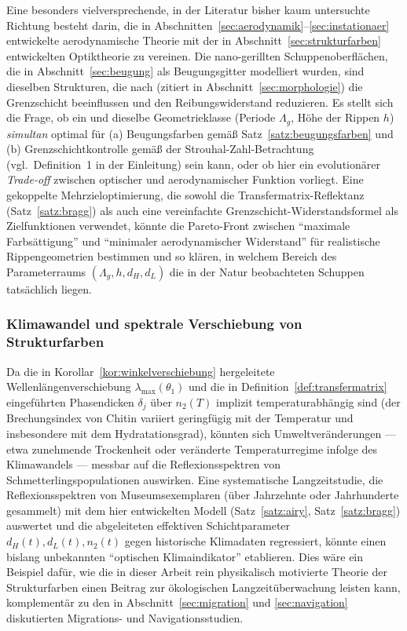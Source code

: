 ﻿\documentclass[a4paper,12pt]{article}
\theoremstyle{definition}
\begin{document}
	Eine besonders vielversprechende, in der Literatur bisher kaum
	untersuchte Richtung besteht darin, die in
	Abschnitten~\ref{sec:aerodynamik}--\ref{sec:instationaer} entwickelte
	aerodynamische Theorie mit der in Abschnitt~\ref{sec:strukturfarben}
	entwickelten Optiktheorie zu vereinen. Die nano-gerillten
	Schuppenoberflächen, die in Abschnitt~\ref{sec:beugung} als
	Beugungsgitter modelliert wurden, sind dieselben Strukturen, die nach
	\cite{chen2018butterfly} (zitiert in
	Abschnitt~\ref{sec:morphologie}) die Grenzschicht beeinflussen und
	den Reibungswiderstand reduzieren. Es stellt sich die Frage, ob ein
	und dieselbe Geometrieklasse (Periode $\Lambda_g$, Höhe der Rippen
	$h$) \emph{simultan} optimal für (a) Beugungsfarben gemäß
	Satz~\ref{satz:beugungsfarben} und (b) Grenzschichtkontrolle gemäß
	der Strouhal-Zahl-Betrachtung (vgl.\ Definition~1 in der Einleitung)
	sein kann, oder ob hier ein
	evolutionärer \emph{Trade-off} zwischen optischer und
	aerodynamischer Funktion vorliegt. Eine gekoppelte
	Mehrzieloptimierung, die sowohl die Transfermatrix-Reflektanz
	(Satz~\ref{satz:bragg}) als auch eine vereinfachte
	Grenzschicht-Widerstandsformel als Zielfunktionen verwendet, könnte
	die Pareto-Front zwischen ``maximale Farbsättigung'' und ``minimaler
	aerodynamischer Widerstand'' für realistische Rippengeometrien
	bestimmen und so klären, in welchem Bereich des
	Parameterraums $(\Lambda_g, h, d_H, d_L)$ die in der Natur
	beobachteten Schuppen tatsächlich liegen.

	\subsubsection{Klimawandel und spektrale Verschiebung von Strukturfarben}

	Da die in Korollar~\ref{kor:winkelverschiebung} hergeleitete
	Wellenlängenverschiebung $\lambda_{\max}(\theta_1)$ und die in
	Definition~\ref{def:transfermatrix} eingeführten Phasendicken
	$\delta_j$ über $n_2(T)$ implizit temperaturabhängig sind (der
	Brechungsindex von Chitin variiert geringfügig mit der Temperatur und
	insbesondere mit dem Hydratationsgrad), könnten sich
	Umweltveränderungen --- etwa zunehmende Trockenheit oder veränderte
	Temperaturregime infolge des Klimawandels --- messbar auf die
	Reflexionsspektren von Schmetterlingspopulationen auswirken. Eine
	systematische Langzeitstudie, die Reflexionsspektren von
	Museumsexemplaren (über Jahrzehnte oder Jahrhunderte gesammelt) mit
	dem hier entwickelten Modell (Satz~\ref{satz:airy},
	Satz~\ref{satz:bragg}) auswertet und die abgeleiteten effektiven
	Schichtparameter $d_H(t), d_L(t), n_2(t)$ gegen historische
	Klimadaten regressiert, könnte einen bislang unbekannten
	``optischen Klimaindikator'' etablieren. Dies wäre ein Beispiel dafür,
	wie die in dieser Arbeit rein physikalisch motivierte Theorie der
	Strukturfarben einen Beitrag zur ökologischen Langzeitüberwachung
	leisten kann, komplementär zu den in
	Abschnitt~\ref{sec:migration} und \ref{sec:navigation} diskutierten
	Migrations- und Navigationsstudien.
\end{document}
